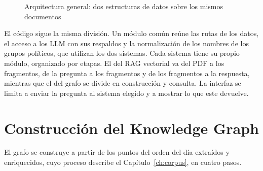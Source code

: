 \documentclass[11pt, a4paper]{report}
\begin{document}
	\begin{figure}[H]
		\centering
		\caption{Arquitectura general: dos estructuras de datos sobre los mismos documentos}
		\label{fig:arquitectura}
	\end{figure}

	El código sigue la misma división. Un módulo común reúne las rutas de los datos, el
	acceso a los LLM con sus respaldos y la normalización de los nombres de los
	grupos políticos, que utilizan los dos sistemas. Cada sistema tiene su propio
	módulo, organizado por etapas. El del RAG vectorial va del PDF a los
	fragmentos, de la pregunta a los fragmentos y de los fragmentos a la
	respuesta, mientras que el del grafo se divide en construcción y consulta. La
	interfaz se limita a enviar la pregunta al sistema elegido y a mostrar lo que
	este devuelve.

	\section{Construcción del Knowledge Graph}
	\label{sec:construccion-grafo}

	El grafo se construye a partir de los puntos del orden del día extraídos y
	enriquecidos, cuyo proceso describe el Capítulo~\ref{ch:corpus}, en cuatro
	pasos.
\end{document}

